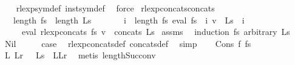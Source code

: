 \begin{isabellebody}
%
\isadelimproof
\ \ %
\endisadelimproof
%
\isatagproof
{}\isamarkupfalse%
\ rlexp{\isacharunderscore}{\kern0pt}sym{\isacharunderscore}{\kern0pt}def\ inst{\isacharunderscore}{\kern0pt}sym{\isacharunderscore}{\kern0pt}def\ \isamarkupfalse%
\ force%
\endisatagproof
{\isafoldproof}%
%
\isadelimproof
\isanewline
%
\endisadelimproof
\isanewline
{}\isamarkupfalse%
\ rlexp{\isacharunderscore}{\kern0pt}concats{\isacharunderscore}{\kern0pt}concats{\isacharcolon}{\kern0pt}\isanewline
\ \ \ {\isachardoublequoteopen}length\ fs\ {\isacharequal}{\kern0pt}\ length\ Ls{\isachardoublequoteclose}\isanewline
\ \ \ \ \ \ \ {\isachardoublequoteopen}{\isasymforall}i\ {\isacharless}{\kern0pt}\ length\ fs{\isachardot}{\kern0pt}\ eval\ {\isacharparenleft}{\kern0pt}fs\ {\isacharbang}{\kern0pt}\ i{\isacharparenright}{\kern0pt}\ v\ {\isacharequal}{\kern0pt}\ Ls\ {\isacharbang}{\kern0pt}\ i{\isachardoublequoteclose}\isanewline
\ \ \ \ \ {\isachardoublequoteopen}eval\ {\isacharparenleft}{\kern0pt}rlexp{\isacharunderscore}{\kern0pt}concats\ fs{\isacharparenright}{\kern0pt}\ v\ {\isacharequal}{\kern0pt}\ concats\ Ls{\isachardoublequoteclose}\isanewline
%
\isadelimproof
%
\endisadelimproof
%
\isatagproof
{}\isamarkupfalse%
\ assms\ \isamarkupfalse%
\ {\isacharparenleft}{\kern0pt}induction\ fs\ arbitrary{\isacharcolon}{\kern0pt}\ Ls{\isacharparenright}{\kern0pt}\isanewline
\ \ \isamarkupfalse%
\ Nil\isanewline
\ \ \isamarkupfalse%
\ \isamarkupfalse%
\ {\isacharquery}{\kern0pt}case\ \isamarkupfalse%
\ rlexp{\isacharunderscore}{\kern0pt}concats{\isacharunderscore}{\kern0pt}def\ concats{\isacharunderscore}{\kern0pt}def\ \isamarkupfalse%
\ simp\isanewline
{}\isamarkupfalse%
\isanewline
\ \ \isamarkupfalse%
\ {\isacharparenleft}{\kern0pt}Cons\ f{}\ fs{\isacharparenright}{\kern0pt}\isanewline
\ \ \isamarkupfalse%
\ \isamarkupfalse%
\ L{}\ Lr\ \ {\isacharasterisk}{\kern0pt}{\isacharcolon}{\kern0pt}\ {\isachardoublequoteopen}Ls\ {\isacharequal}{\kern0pt}\ L{}{\isacharhash}{\kern0pt}Lr{\isachardoublequoteclose}\ \isamarkupfalse%
\ {\isacharparenleft}{\kern0pt}metis\ length{\isacharunderscore}{\kern0pt}Suc{\isacharunderscore}{\kern0pt}conv{\isacharparenright}{\kern0pt}\isanewline

\end{isabellebody}
